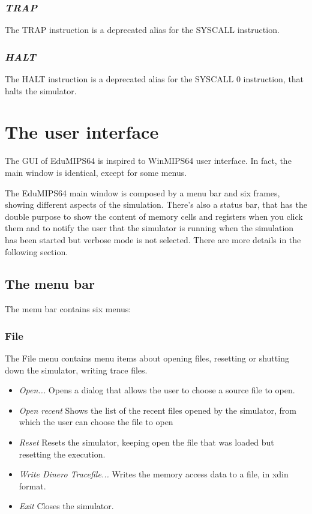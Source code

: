 \documentclass[letterpaper,10pt,english]{sphinxmanual}
\begin{document}
\subsection{\emph{TRAP}}
\label{instructions:trap}
The TRAP instruction is a deprecated alias for the SYSCALL instruction.


\subsection{\emph{HALT}}
\label{instructions:halt}
The HALT instruction is a deprecated alias for the SYSCALL 0 instruction, that
halts the simulator.


\chapter{The user interface}
\label{user-interface:the-user-interface}\label{user-interface::doc}
The GUI of EduMIPS64 is inspired to WinMIPS64 user interface. In fact, the main window
is identical, except for some menus.

The EduMIPS64 main window is composed by a menu bar and six frames, showing
different aspects of the simulation. There's also a status bar, that has the
double purpose to show the content of memory cells and registers when you
click them and to notify the user that the simulator is running when the
simulation has been started but verbose mode is not selected. There are more
details in the following section.


\section{The menu bar}
\label{user-interface:the-menu-bar}
The menu bar contains six menus:


\subsection{File}
\label{user-interface:file}
The File menu contains menu items about opening files, resetting or shutting
down the simulator, writing trace files.
\begin{itemize}
\item {} 
\emph{Open...} Opens a dialog that allows the user to choose
a source file to open.

\item {} 
\emph{Open recent} Shows the list of the recent files opened by the
simulator, from which the user can choose the file to open

\item {} 
\emph{Reset} Resets the simulator, keeping open the file that was
loaded but resetting the execution.

\item {} 
\emph{Write Dinero Tracefile...} Writes the memory access data to a
file, in xdin format.

\item {} 
\emph{Exit} Closes the simulator.

\end{itemize}
\end{document}
